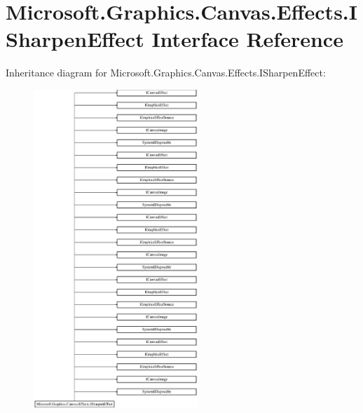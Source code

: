 \hypertarget{interface_microsoft_1_1_graphics_1_1_canvas_1_1_effects_1_1_i_sharpen_effect}{}\section{Microsoft.\+Graphics.\+Canvas.\+Effects.\+I\+Sharpen\+Effect Interface Reference}
\label{interface_microsoft_1_1_graphics_1_1_canvas_1_1_effects_1_1_i_sharpen_effect}
Inheritance diagram for Microsoft.\+Graphics.\+Canvas.\+Effects.\+I\+Sharpen\+Effect\+:\begin{figure}[H]
\begin{center}
\leavevmode
\includegraphics[height=12.000000cm]{interface_microsoft_1_1_graphics_1_1_canvas_1_1_effects_1_1_i_sharpen_effect}
\end{center}
\end{figure}
